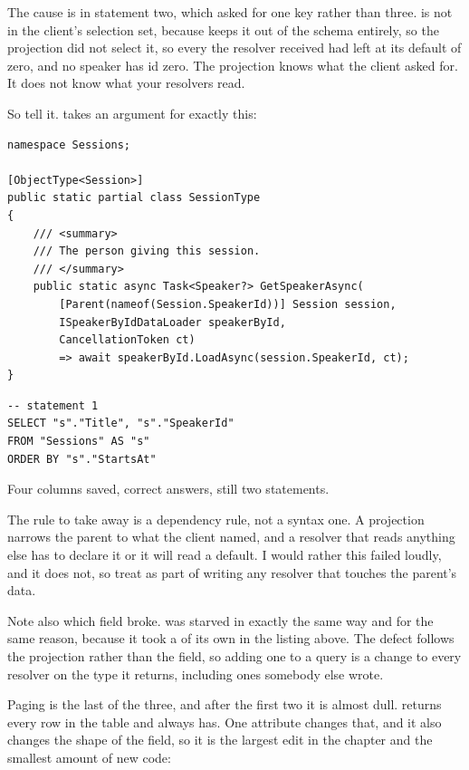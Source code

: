 %
The cause is in statement two, which asked for one key rather than three.
 is not in the client's selection set, because
\code{[GraphQLIgnore]} keeps it out of the schema entirely, so the projection
did not select it, so every  the resolver received had
 left at its default of zero, and no speaker has id zero. The
projection knows what the client asked for. It does not know what your
resolvers read.

So tell it. \code{[Parent]} takes an argument for exactly this:

\begin{verbatim}
namespace Sessions;

[ObjectType<Session>]
public static partial class SessionType
{
    /// <summary>
    /// The person giving this session.
    /// </summary>
    public static async Task<Speaker?> GetSpeakerAsync(
        [Parent(nameof(Session.SpeakerId))] Session session,
        ISpeakerByIdDataLoader speakerById,
        CancellationToken ct)
        => await speakerById.LoadAsync(session.SpeakerId, ct);
}
\end{verbatim}

\begin{verbatim}
-- statement 1
SELECT "s"."Title", "s"."SpeakerId"
FROM "Sessions" AS "s"
ORDER BY "s"."StartsAt"
\end{verbatim}

Four columns saved, correct answers, still two statements.

%
The rule to take away is a dependency rule, not a syntax one. A projection
narrows the parent to what the client named, and a resolver that reads anything
else has to declare it or it will read a default. I would rather this failed
loudly, and it does not, so treat \code{[Parent(...)]} as part of writing any
resolver that touches the parent's data.

%
Note also which field broke.  was starved in exactly the same
way and for the same reason, because it took a  of its own
in the listing above. The defect follows the projection rather than the field,
so adding one to a query is a change to every resolver on the type it returns,
including ones somebody else wrote.

%
Paging is the last of the three, and after the first two it is almost dull.
 returns every row in the table and always has. One attribute
changes that, and it also changes the shape of the field, so it is the largest
edit in the chapter and the smallest amount of new code:

